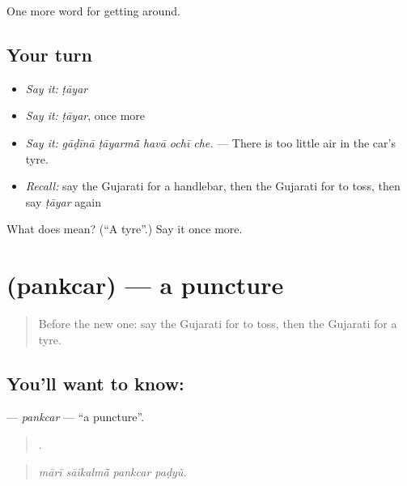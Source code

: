 \begin{grammarlens}[title={What you've built}]
One more word for getting around.
\end{grammarlens}

\subsection*{Your turn}
\begin{itemize}
\raggedright
  \item \emph{Say it:} \emph{ṭāyar}
  \item \emph{Say it:} \emph{ṭāyar}, once more
  \item \emph{Say it:} \emph{gāḍīnā ṭāyarmā̃ havā ochī che.} — There is too little air in the car's tyre.
  \item \emph{Recall:} say the Gujarati for a handlebar, then the Gujarati for to toss, then say \emph{ṭāyar} again
\end{itemize}

\begin{tcolorbox}[breakable,colback=teal!4,colframe=teal!35!black,title={Before you move on}]
What does  mean? (\textquotedblleft{}A tyre\textquotedblright{}.) Say it once more.
\end{tcolorbox}
\section[\texorpdfstring{\gu{પંક્ચર} (pankcar)}{પંક્ચર (pankcar)}]{ (pankcar) — a puncture}

\label{lesson:GU-C401-pankcar}



\begin{quote}
Before the new one: say the Gujarati for to toss, then the Gujarati for a tyre.
\end{quote}

\subsection*{You'll want to know: }
\textbf{} — \emph{pankcar} — \textquotedblleft{}a puncture\textquotedblright{}.

\begin{quote}
   .
\end{quote}

\begin{quote}
\emph{mārī sāīkalmā̃ pankcar paḍyũ.}
\end{quote}

